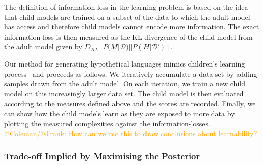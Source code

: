\documentclass[11pt]{article}
\begin{document}




The definition of information loss in the learning problem is based on the idea that child models are trained on a subset of the data to which the adult model has access and therefore child models cannot encode more information. The exact information-loss is then measured as the KL-divergence of the child model from the adult model given by $D_{KL}[P(M|\mathcal{D})||P(H|\mathcal{D}')]$.

Our method for generating hypothetical languages mimics children's learning process~\cite{todo} and proceeds as follows. We iteratively accumulate a data set by adding samples drawn from the adult model. On each iteration, we train a new child model on this increasingly larger data set. The child model is then evaluated according to the measures defined above and the scores are recorded. Finally, we can show how the child models learn as they are exposed to more data by plotting the measured complexities against the information-losses.
\textcolor{orange}{@Coleman/@Frank: How can we use this to draw conclusions about learnability?}


\subsubsection{Trade-off Implied by Maximising the Posterior}
\label{sssec:learn_tradeoff}
\end{document}
